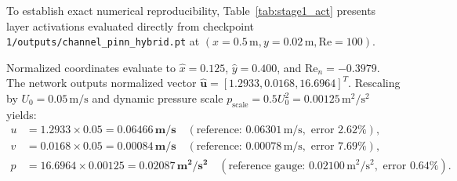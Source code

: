 \documentclass[11pt,a4paper]{article}
\begin{document}
To establish exact numerical reproducibility, Table~\ref{tab:stage1_act} presents layer activations evaluated directly from checkpoint \texttt{1/outputs/channel\_pinn\_hybrid.pt} at $(x=0.5\,\text{m}, y=0.02\,\text{m}, \mathrm{Re}=100)$.
\begin{table}[H]
\centering
{}
\caption{Deterministic layer-by-layer forward pass evaluated at $(x=0.5\,\text{m}, y=0.02\,\text{m}, \mathrm{Re}=100)$. Normalized input vector: $[0.1250, 0.4000, -0.3979]^{\mathsf T}$. Checkpoint SHA256: \texttt{4d200a420951a10b...}.}
\label{tab:stage1_act}
\end{table}
Normalized coordinates evaluate to $\hat{x} = 0.125$, $\hat{y} = 0.400$, and $\mathrm{Re}_n = -0.3979$. The network outputs normalized vector $\hat{\mathbf{u}} = [1.2933, 0.0168, 16.6964]^T$.
Rescaling by $U_0 = 0.05\,\text{m/s}$ and dynamic pressure scale $p_{\mathrm{scale}} = 0.5 U_0^2 = 0.00125\,\text{m}^2/\text{s}^2$ yields:
\begin{align}
u &= 1.2933 \times 0.05 = \mathbf{0.06466\,\text{m/s}} \quad (\text{reference: } 0.06301\,\text{m/s}, \text{ error } 2.62\%), \\
v &= 0.0168 \times 0.05 = \mathbf{0.00084\,\text{m/s}} \quad (\text{reference: } 0.00078\,\text{m/s}, \text{ error } 7.69\%), \\
p &= 16.6964 \times 0.00125 = \mathbf{0.02087\,\text{m}^2/\text{s}^2} \quad (\text{reference gauge: } 0.02100\,\text{m}^2/\text{s}^2, \text{ error } 0.64\%).
\end{align}
\end{document}
